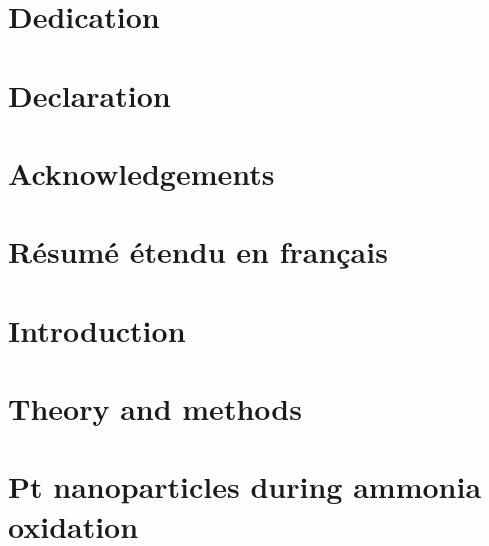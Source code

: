 \documentclass[11pt]{report}
\begin{document}
    
    \newpage
    

        \chapter*{Dedication}
        
        \chapter*{Declaration}
        
        \chapter*{Acknowledgements}
        
        \chapter*{Résumé étendu en français}
        

    \frontmatter
    {\hypersetup{linkcolor=black}
        \tableofcontents
    }
    \newpage

    \mainmatter
    \chapter{Introduction}
    
     
    \chapter{Theory and methods}
    
    
    
    
    
    
    

    \chapter{Pt nanoparticles during ammonia oxidation}
    
    
    
    
    
\end{document}
